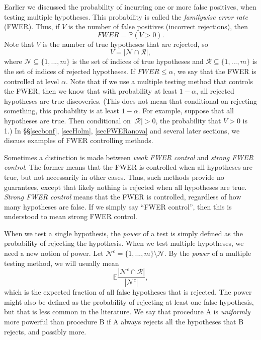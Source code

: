 \documentclass[11pt]{article}
\theoremstyle{plain}
\theoremstyle{definition}
\newcommand{\N}{\mathcal{N}}
\newcommand{\R}{\mathcal{R}}
\newcommand{\Hy}{\mathcal{H}}
\newcommand{\pr}{\mathbb{P}}
\begin{document}
Earlier we discussed the probability of incurring one or more false positives, when testing multiple hypotheses. This probability is called the \emph{familywise error rate} (FWER). Thus, if $V$ is the number of false positives (incorrect rejections), then
$$FWER=\pr(V>0).$$
Note that $V$ is the number of true hypotheses that are rejected, so
$$V=|\N\cap \R|,$$
where $\N\subseteq\{1,...,m\}$ is the set of indices of true hypotheses and $\R \subseteq\{1,...,m\}$ is the set of indices of rejected hypotheses.
If $FWER\leq \alpha$, we say that the FWER is controlled at level $\alpha$.
Note that if we use a multiple testing method that controls the FWER, then we know that with probability at least $1-\alpha$, all rejected hypotheses are true discoveries. (This does not mean that conditional on rejecting something, this probability is at least $1-\alpha$. For example, suppose that all hypotheses are true. Then conditional on $|\R|>0$, the probability that $V>0$ is 1.) In \S\S\ref{secbonf}, \ref{secHolm}, \ref{secFWERanova} and several later sections, we discuss examples of FWER controlling methods.

Sometimes a distinction is made between \emph{weak FWER control} and \emph{strong FWER control}. The former means that the FWER is controlled when all hypotheses are true, but not necessarily in other cases. Thus, such methods provide no guarantees, except that likely nothing is rejected when all hypotheses are true. \emph{Strong FWER control} means that the FWER is controlled, regardless of how many hypotheses are false. If we simply say ``FWER control'', then this is understood to mean strong FWER control.

When we test  a single hypothesis, the \emph{power} of a test is simply defined as the probability of rejecting the hypothesis. When we test multiple hypotheses, we need a new notion of power. Let $\N^c=\{1,...,m\}\setminus\N$. By the \emph{power} of a multiple testing method, we will usually mean
$$\mathbb{E}\frac{|\N^c\cap \R|}{|\N^c|},$$
which is the expected fraction of all false hypotheses that is rejected. The power might also be defined as the probability of rejecting at least one false hypothesis, but that is less common in the literature.
We say that procedure A is \emph{uniformly} more powerful than procedure B if A always rejects all the hypotheses that B rejects, and possibly more. 
\end{document}

